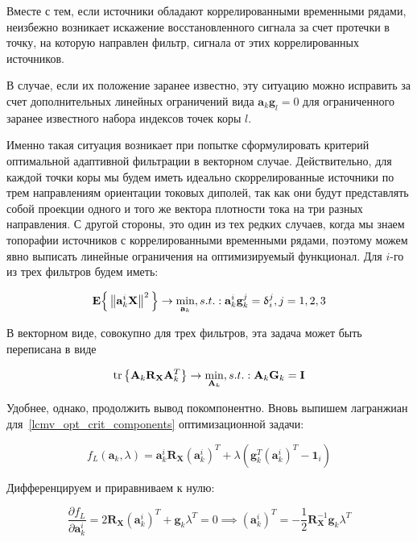 Вместе с тем, если источники обладают коррелированными временными рядами, неизбежно возникает искажение
восстановленного сигнала за счет протечки в точку, на которую направлен фильтр, сигнала от
этих коррелированных источников.

В случае, если их положение заранее известно, эту ситуацию можно исправить за счет дополнительных
линейных ограничений вида $\mathbf{a}_k \mathbf{g}_l=0$ для ограниченного заранее известного
набора индексов точек коры $l$.

Именно такая ситуация возникает при попытке сформулировать критерий оптимальной
адаптивной фильтрации в векторном случае. Действительно, для каждой точки коры мы будем
иметь идеально скоррелированные источники по трем направлениям ориентации токовых диполей,
так как они будут представлять собой проекции одного и того же вектора плотности тока на три разных
направления. С другой стороны, это один из тех редких случаев, когда мы знаем топорафии
источников с коррелированными временными рядами, поэтому можем явно выписать линейные ограничения
на оптимизируемый функционал. Для $i$-го из трех фильтров будем иметь:

\begin{equation}
    \mathbf{E}\Big\{\left\lVert\mathbf{a}_k^i \mathbf{X}\right\rVert^2\Big\}
    \rightarrow \underset{\mathbf{a}_k}{\min},
    s.t.: \mathbf{a}_k^i \mathbf{g}_k^j =  \updelta_i^j, j = 1,2,3
    \label{lcmv_opt_crit_components}
\end{equation}

В векторном виде, совокупно для трех фильтров, эта задача может быть переписана в виде


\begin{equation}
    \operatorname{tr}\left\{
        \mathbf{A}_k \mathbf{R}_\mathbf{X}\mathbf{A}_k^T
    \right\} \rightarrow \underset{\mathbf{A}_k}{\min},
    s.t.: \mathbf{A}_k \mathbf{G}_k =  \mathbf{I}
    \label{lcmv_opt_criterion_vec}
\end{equation}

Удобнее, однако, продолжить вывод покомпонентно.
Вновь выпишем лагранжиан для~\ref{lcmv_opt_crit_components} оптимизационной задачи:

\begin{equation}
    f_L(\mathbf{a}_k, \lambda) = \mathbf{a}_k^i \mathbf{R}_\mathbf{X} (\mathbf{a}_k^i)^T +
    \lambda (\mathbf{g}_k^T (\mathbf{a}_k^i)^T - \mathbf{1}_i)
\end{equation}

Дифференцируем и приравниваем к нулю:

\begin{equation}
    \frac{\partial f_L}{\partial \mathbf{a}_k^i} =
    2 \mathbf{R}_\mathbf{X} (\mathbf{a}_k^i)^T + \mathbf{g}_k \lambda^T = 0 \implies
    (\mathbf{a}_k^i)^T = - \frac{1}{2}\mathbf{R}_\mathbf{X}^{-1} \mathbf{g}_k \lambda^T
\end{equation}

